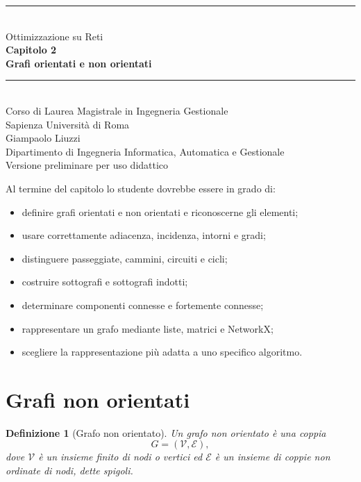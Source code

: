 \documentclass[11pt,a4paper]{article}
\newtheorem{definition}{Definizione}[section]
\newcommand{\V}{\mathcal{V}}
\newcommand{\E}{\mathcal{E}}
\begin{document}
\hypersetup{pageanchor=false}
\begin{titlepage}
\centering
\vspace*{1.6cm}
{\color{sapienzared}\rule{\textwidth}{1.2pt}}\\[1.1cm]
{\Large Ottimizzazione su Reti}\\[0.35cm]
{\huge\bfseries Capitolo 2}\\[0.45cm]
{\LARGE\bfseries Grafi orientati e non orientati}\\[1.1cm]
{\color{sapienzared}\rule{0.72\textwidth}{0.8pt}}\\[1.1cm]
{\large Corso di Laurea Magistrale in Ingegneria Gestionale}\\[0.25cm]
{\large Sapienza Università di Roma}\\[1.2cm]
{\large Giampaolo Liuzzi}\\[0.25cm]
{\normalsize Dipartimento di Ingegneria Informatica, Automatica e Gestionale}\\[2cm]
\vfill
{\small Versione preliminare per uso didattico}
\end{titlepage}
\hypersetup{pageanchor=true}
\tableofcontents
\newpage
{}

\begin{learningbox}
Al termine del capitolo lo studente dovrebbe essere in grado di:
\begin{itemize}[nosep]
\item definire grafi orientati e non orientati e riconoscerne gli elementi;
\item usare correttamente adiacenza, incidenza, intorni e gradi;
\item distinguere passeggiate, cammini, circuiti e cicli;
\item costruire sottografi e sottografi indotti;
\item determinare componenti connesse e fortemente connesse;
\item rappresentare un grafo mediante liste, matrici e NetworkX;
\item scegliere la rappresentazione più adatta a uno specifico algoritmo.
\end{itemize}
\end{learningbox}

\section{Grafi non orientati}

\begin{definition}[Grafo non orientato]
Un grafo non orientato è una coppia
\[
G=(\V,\E),
\]
dove $\V$ è un insieme finito di \emph{nodi} o \emph{vertici} ed $\E$ è un insieme di coppie non ordinate di nodi, dette \emph{spigoli}.
\end{definition}
\end{document}
